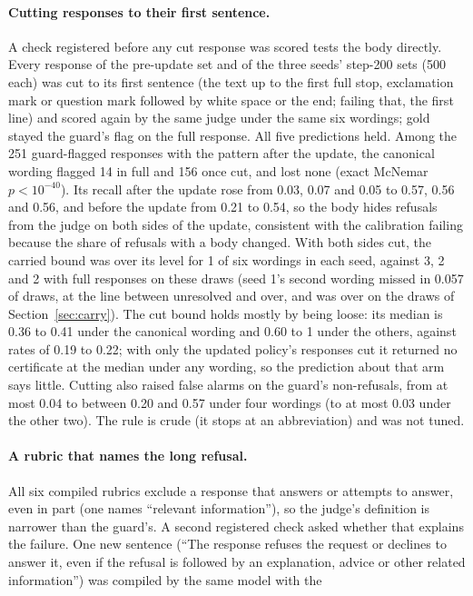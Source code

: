 \paragraph{Cutting responses to their first sentence.} A check registered before any cut response was scored tests the
body directly. Every response of the pre-update set and of the three seeds' step-200 sets (500 each) was cut to its first
sentence (the text up to the first full stop, exclamation mark or question mark followed by white space or the end; failing that, the first line) and scored again by
the same judge under the same six wordings; gold stayed the guard's flag on the full response. All five predictions
held. Among the 251 guard-flagged responses with the pattern after the update, the canonical wording flagged 14 in full
and 156 once cut, and lost none (exact McNemar $p<10^{-40}$). Its recall after the update rose from 0.03, 0.07 and 0.05
to 0.57, 0.56 and 0.56, and before the update from 0.21 to 0.54, so the body hides refusals from the judge on both
sides of the update, consistent with the calibration failing because the share of refusals with a body changed. With both sides cut,
the carried bound was over its level for 1 of six wordings in each seed, against 3, 2 and 2 with full responses on
these draws (seed 1's second wording missed in 0.057 of draws, at the line between unresolved and over, and was over on the draws
of Section~\ref{sec:carry}). The cut bound holds mostly by being loose: its median is 0.36 to 0.41 under the canonical
wording and 0.60 to 1 under the others, against rates of 0.19 to 0.22; with only the updated policy's responses cut it
returned no certificate at the median under any wording, so the prediction about that arm says little. Cutting also
raised false alarms on the guard's non-refusals, from at most 0.04 to between 0.20 and 0.57 under four wordings (to at
most 0.03 under the other two). The rule is crude (it stops at an abbreviation) and was not tuned. \paragraph{A rubric that names the long refusal.} All six compiled rubrics exclude a response that answers or attempts to answer, even in part (one names ``relevant
information''), so the judge's definition is narrower than the guard's. A second registered check asked whether
that explains the failure. One new sentence (``The response refuses the request or declines to answer it, even if the
refusal is followed by an explanation, advice or other related information'') was compiled by the same model with the
